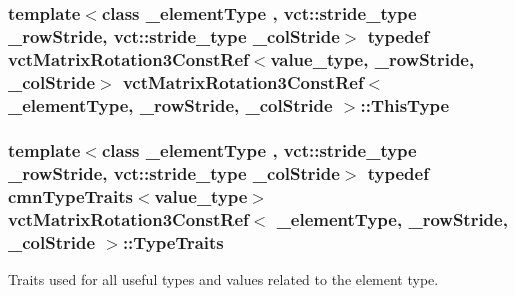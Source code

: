 \hypertarget{classvct_matrix_rotation3_const_ref_a92075d31084a3f4bb466e724a8719693}{
\subsubsection[{This\-Type}]{\setlength{\rightskip}{0pt plus 5cm}template$<$class \-\_\-element\-Type , vct\-::stride\-\_\-type \-\_\-row\-Stride, vct\-::stride\-\_\-type \-\_\-col\-Stride$>$ typedef {\bf vct\-Matrix\-Rotation3\-Const\-Ref}$<$value\-\_\-type, \-\_\-row\-Stride, \-\_\-col\-Stride$>$ {\bf vct\-Matrix\-Rotation3\-Const\-Ref}$<$ \-\_\-element\-Type, \-\_\-row\-Stride, \-\_\-col\-Stride $>$\-::{\bf This\-Type}}}\label{classvct_matrix_rotation3_const_ref_a92075d31084a3f4bb466e724a8719693}
\hypertarget{classvct_matrix_rotation3_const_ref_aa8c0563184a7d080a880ca6b066b2440}{
\subsubsection[{Type\-Traits}]{\setlength{\rightskip}{0pt plus 5cm}template$<$class \-\_\-element\-Type , vct\-::stride\-\_\-type \-\_\-row\-Stride, vct\-::stride\-\_\-type \-\_\-col\-Stride$>$ typedef {\bf cmn\-Type\-Traits}$<$value\-\_\-type$>$ {\bf vct\-Matrix\-Rotation3\-Const\-Ref}$<$ \-\_\-element\-Type, \-\_\-row\-Stride, \-\_\-col\-Stride $>$\-::{\bf Type\-Traits}}}\label{classvct_matrix_rotation3_const_ref_aa8c0563184a7d080a880ca6b066b2440}
Traits used for all useful types and values related to the element type. 

